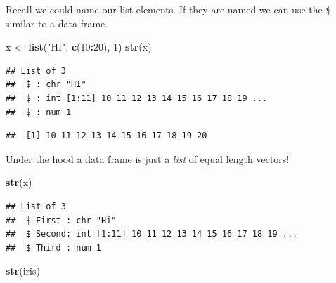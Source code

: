 \documentclass[
]{book}
\newenvironment{Shaded}{\begin{snugshade}}{\end{snugshade}}
\newcommand{\DataTypeTok}[1]{\textcolor[rgb]{0.13,0.29,0.53}{#1}}
\newcommand{\DecValTok}[1]{\textcolor[rgb]{0.00,0.00,0.81}{#1}}
\newcommand{\KeywordTok}[1]{\textcolor[rgb]{0.13,0.29,0.53}{\textbf{#1}}}
\newcommand{\NormalTok}[1]{#1}
\newcommand{\OperatorTok}[1]{\textcolor[rgb]{0.81,0.36,0.00}{\textbf{#1}}}
\newcommand{\StringTok}[1]{\textcolor[rgb]{0.31,0.60,0.02}{#1}}
\theoremstyle{definition}
\theoremstyle{definition}
\theoremstyle{definition}
\theoremstyle{remark}
\begin{document}
Recall we could name our list elements. If they are named we can use the \texttt{\$} similar to a data frame.

\begin{Shaded}
\begin{Highlighting}[]
\NormalTok{x <-}\StringTok{ }\KeywordTok{list}\NormalTok{(}\StringTok{"HI"}\NormalTok{, }\KeywordTok{c}\NormalTok{(}\DecValTok{10}\OperatorTok{:}\DecValTok{20}\NormalTok{), }\DecValTok{1}\NormalTok{)}
\KeywordTok{str}\NormalTok{(x)}
\end{Highlighting}
\end{Shaded}

\begin{verbatim}
## List of 3
##  $ : chr "HI"
##  $ : int [1:11] 10 11 12 13 14 15 16 17 18 19 ...
##  $ : num 1
\end{verbatim}

\begin{Shaded}
\end{Shaded}

\begin{verbatim}
##  [1] 10 11 12 13 14 15 16 17 18 19 20
\end{verbatim}

Under the hood a data frame is just a \emph{list} of equal length vectors!

\begin{Shaded}
\begin{Highlighting}[]
\KeywordTok{str}\NormalTok{(x)}
\end{Highlighting}
\end{Shaded}

\begin{verbatim}
## List of 3
##  $ First : chr "Hi"
##  $ Second: int [1:11] 10 11 12 13 14 15 16 17 18 19 ...
##  $ Third : num 1
\end{verbatim}

\begin{Shaded}
\begin{Highlighting}[]
\KeywordTok{str}\NormalTok{(iris)}
\end{Highlighting}
\end{Shaded}
\end{document}
